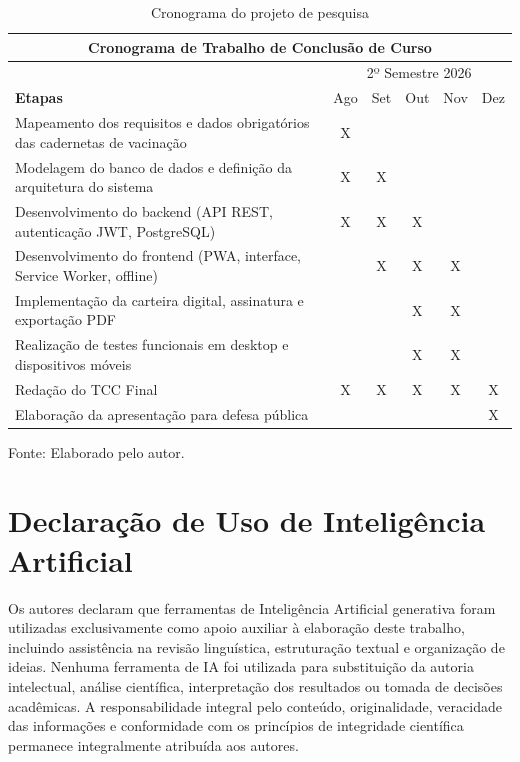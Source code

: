 \documentclass{UNESC}
\begin{document}
\begin{table}[H]
\centering
\caption{Cronograma do projeto de pesquisa}
\vspace{-0.2cm}
\begin{tabular}{|p{8cm}|c|c|c|c|c|}
\hline
\multicolumn{6}{|c|}{\textbf{Cronograma de Trabalho de Conclusão de Curso}} \\
\hline
& \multicolumn{5}{|c|}{2º Semestre 2026} \\
\hline\hline
\textbf{Etapas} & Ago & Set & Out & Nov & Dez \\
\hline
Mapeamento dos requisitos e dados obrigatórios das cadernetas de vacinação & X & & & & \\
\hline
Modelagem do banco de dados e definição da arquitetura do sistema & X & X & & & \\
\hline
Desenvolvimento do backend (API REST, autenticação JWT, PostgreSQL) & X & X & X & & \\
\hline
Desenvolvimento do frontend (PWA, interface, Service Worker, offline) & & X & X & X & \\
\hline
Implementação da carteira digital, assinatura e exportação PDF & & & X & X & \\
\hline
Realização de testes funcionais em desktop e dispositivos móveis & & & X & X & \\
\hline
Redação do TCC Final & X & X & X & X & X \\
\hline
Elaboração da apresentação para defesa pública & & & & & X \\
\hline
\end{tabular}
\flushleft
\vspace{-0.1cm}
\hspace{0cm}\footnotesize Fonte: Elaborado pelo autor.
\end{table}

\section*{Declaração de Uso de Inteligência Artificial}
Os autores declaram que ferramentas de Inteligência Artificial generativa foram utilizadas exclusivamente como apoio auxiliar à elaboração deste trabalho, incluindo assistência na revisão linguística, estruturação textual e organização de ideias. Nenhuma ferramenta de IA foi utilizada para substituição da autoria intelectual, análise científica, interpretação dos resultados ou tomada de decisões acadêmicas. A responsabilidade integral pelo conteúdo, originalidade, veracidade das informações e conformidade com os princípios de integridade científica permanece integralmente atribuída aos autores.


\renewcommand{\refname}{REFERÊNCIAS}

%
%
\end{document}
